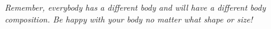 \emph{
    Remember, everybody has a different body and will have a different body
    composition. Be happy with your body no matter what shape or size!
}
